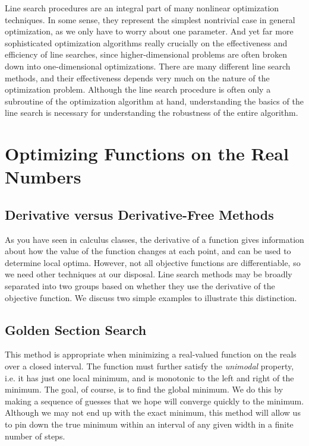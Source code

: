 Line search procedures are an integral part of many nonlinear optimization techniques.
In some sense, they represent the simplest nontrivial case in general optimization, as
we only have to worry about one parameter. And yet far more sophisticated optimization
algorithms really crucially on the effectiveness and efficiency of line searches, since
higher-dimensional problems are often broken down into one-dimensional optimizations.
There are many different line search methods, and their effectiveness depends very much
on the nature of the optimization problem. Although the line search procedure is often
only a subroutine of the optimization algorithm at hand, understanding the basics of
the line search is necessary for understanding the robustness of the entire algorithm.
\section*{Optimizing Functions on the Real Numbers}
\subsection*{Derivative versus Derivative-Free Methods}
As you have seen in calculus classes, the derivative of a function gives information
about how the value of the function changes at each point, and can be used to determine
local optima. However, not all objective functions are differentiable, so we need other
techniques at our disposal. Line search methods may be broadly separated into two groups
based on whether they use the derivative of the objective function. We discuss two
simple examples to illustrate this distinction.

\subsection*{Golden Section Search}
This method is appropriate when minimizing a real-valued function on the reals over a
closed interval. The function must further satisfy the \emph{unimodal} property, i.e.
it has just one local minimum, and is monotonic to the left and right of the minimum.
The goal, of course, is to find the
global minimum. We do this by making a sequence of guesses that we hope will converge
quickly to the minimum. Although we may not end up with the exact minimum, this method
will allow us to pin down the true minimum within an interval of any given width in a
finite number of steps.

